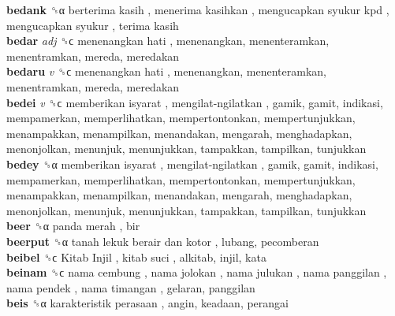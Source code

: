 \textbf{bedank} ␝α   berterima kasih ,  menerima kasihkan ,  mengucapkan syukur kpd ,  mengucapkan syukur ,  terima kasih   \\
\textbf{bedar} \emph{adj}  ␝ϲ   menenangkan hati , menenangkan, menenteramkan, menentramkan, mereda, meredakan  \\
\textbf{bedaru} \emph{v}  ␝ϲ   menenangkan hati , menenangkan, menenteramkan, menentramkan, mereda, meredakan  \\
\textbf{bedei} \emph{v}  ␝ϲ   memberikan isyarat ,  mengilat-ngilatkan , gamik, gamit, indikasi, mempamerkan, memperlihatkan, mempertontonkan, mempertunjukkan, menampakkan, menampilkan, menandakan, mengarah, menghadapkan, menonjolkan, menunjuk, menunjukkan, tampakkan, tampilkan, tunjukkan  \\
\textbf{bedey} ␝α   memberikan isyarat ,  mengilat-ngilatkan , gamik, gamit, indikasi, mempamerkan, memperlihatkan, mempertontonkan, mempertunjukkan, menampakkan, menampilkan, menandakan, mengarah, menghadapkan, menonjolkan, menunjuk, menunjukkan, tampakkan, tampilkan, tunjukkan  \\
\textbf{beer} ␝α   panda merah , bir  \\
\textbf{beerput} ␝α   tanah lekuk berair dan kotor , lubang, pecomberan  \\
\textbf{beibel} ␝ϲ   Kitab Injil ,  kitab suci , alkitab, injil, kata  \\
\textbf{beinam} ␝ϲ   nama cembung ,  nama jolokan ,  nama julukan ,  nama panggilan ,  nama pendek ,  nama timangan , gelaran, panggilan  \\
\textbf{beis} ␝α   karakteristik perasaan , angin, keadaan, perangai  \\
